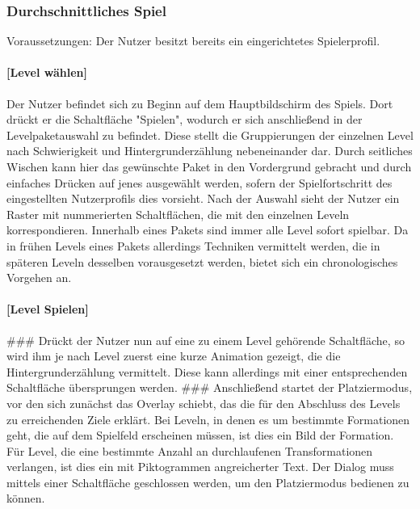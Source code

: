 \subsubsection{Durchschnittliches Spiel}
Voraussetzungen: Der Nutzer besitzt bereits ein eingerichtetes Spielerprofil.
\newline
\newline
\paragraph{{[}Level wählen{]}}
Der Nutzer befindet sich zu Beginn auf dem Hauptbildschirm des Spiels.
Dort drückt er die Schaltfläche "Spielen", wodurch er sich anschließend 
in der Levelpaketauswahl zu befindet. Diese stellt
die Gruppierungen der einzelnen Level nach Schwierigkeit und 
Hintergrunderzählung nebeneinander dar. Durch seitliches Wischen kann hier
das gewünschte Paket in den Vordergrund gebracht und durch einfaches
Drücken auf jenes ausgewählt werden, sofern der Spielfortschritt des 
eingestellten Nutzerprofils dies vorsieht. Nach der Auswahl sieht der Nutzer
ein Raster mit nummerierten Schaltflächen, die mit den einzelnen Leveln
korrespondieren. Innerhalb eines Pakets sind immer alle Level sofort 
spielbar. Da in frühen Levels eines Pakets allerdings Techniken vermittelt
werden, die in späteren Leveln desselben vorausgesetzt werden, bietet sich 
ein chronologisches Vorgehen an. 
\newline
\newline
\paragraph{{[}Level Spielen{]}}
\#\#\# Drückt der Nutzer nun auf eine zu einem
Level gehörende Schaltfläche, so wird ihm je nach Level zuerst eine kurze
Animation gezeigt, die die Hintergrunderzählung vermittelt. Diese kann 
allerdings mit einer entsprechenden Schaltfläche übersprungen werden. \#\#\#
\newline
\newline
Anschließend startet der Platziermodus, vor den sich zunächst das Overlay
schiebt, das die für den Abschluss des Levels zu erreichenden Ziele
erklärt. Bei Leveln, in denen es um bestimmte Formationen geht, die auf
dem Spielfeld erscheinen müssen, ist dies ein Bild der Formation. Für
Level, die eine bestimmte Anzahl an durchlaufenen Transformationen
verlangen, ist dies ein mit Piktogrammen angreicherter Text.
\newline
\newline
Der Dialog muss mittels einer Schaltfläche geschlossen werden, um den
Platziermodus bedienen zu können. 
\newline
\newline

